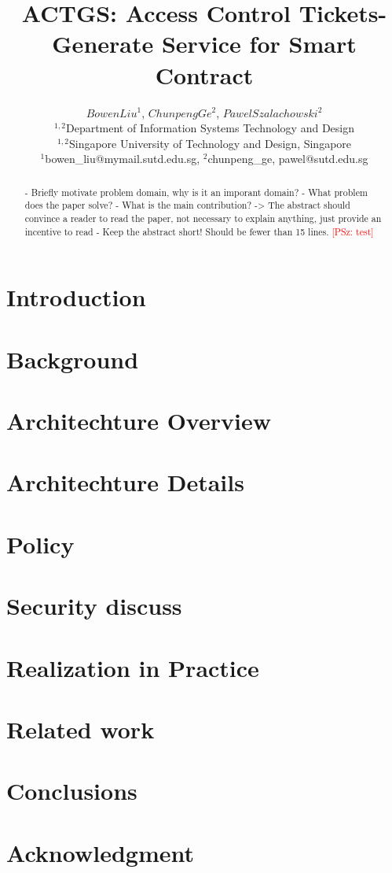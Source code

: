 \documentclass[twocolumn]{article}
\title{ACTGS: Access Control Tickets-Generate Service for Smart Contract}
\author{$Bowen Liu^{1}$, $Chunpeng Ge^{2}$, $Pawel Szalachowski^{2}$\\
    \small{$^{1,2}$Department of Information Systems Technology and Design}\\
    \small{$^{1,2}$Singapore University of Technology and Design, Singapore}\\
    \small{$^{1}$bowen\_liu@mymail.sutd.edu.sg, $^{2}$chunpeng\_ge, pawel@sutd.edu.sg}\\
}
\date{}
\newcommand{\psz}[1]{\textcolor{red}{\footnotesize [PSz: #1]}}
\begin{document}
\maketitle

\begin{abstract}
- Briefly motivate problem domain, why is it an imporant domain?
- What problem does the paper solve?
- What is the main contribution?
-> The abstract should convince a reader to read the paper, not
  necessary to explain anything, just provide an incentive to read
- Keep the abstract short! Should be fewer than 15 lines.
\psz{test}
\end{abstract}

\section{Introduction}
\label{sec:intro}


\section{Background}
\label{sec:pre}


\section{Architechture Overview}
\label{sec:overview}


\section{Architechture Details}
\label{sec:details}


\section{Policy}
\label{sec:policy}


\section{Security discuss}
\label{sec:security}


\section{Realization in Practice}
\label{sec:implementation}


% 

\section{Related work}
\label{sec:related}


\section{Conclusions}
\label{sec:conclusions}



\section*{Acknowledgment}
\label{sec:ack}




\end{document}

